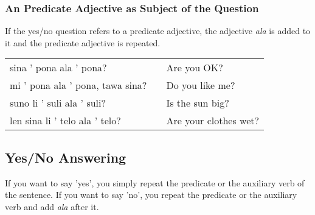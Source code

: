 \subsubsection*{An Predicate Adjective as Subject of the Question}
%

If the yes/no question refers to a predicate adjective, the adjective \textit{ala} is added to it and the predicate adjective is repeated.

\begin{supertabular}{p{5,5cm}|ll}
    sina ' pona ala ' pona?          &  & Are you OK?           \\
    mi ' pona ala ' pona, tawa sina? &  & Do you like me?       \\
    suno li ' suli ala ' suli?       &  & Is the sun big?       \\
    len sina li ' telo ala ' telo?   &  & Are your clothes wet? \\
\end{supertabular}

%
\newpage
\subsection*{Yes/No Answering}
%

If you want to say 'yes', you simply repeat the predicate or the auxiliary verb of the sentence.
If you want to say 'no', you repeat the predicate or the auxiliary verb and add \textit{ala} after it.


